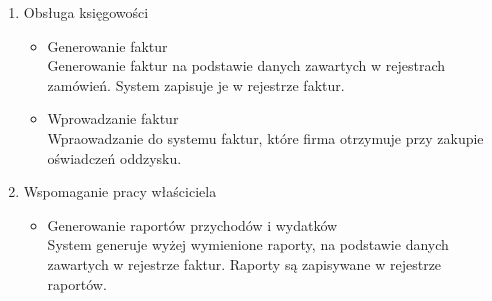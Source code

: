 \begin{enumerate}
	\item Obsługa księgowości
		\begin{itemize}
		\item Generowanie faktur \\ 
		Generowanie faktur na podstawie danych zawartych w rejestrach zamówień. System zapisuje je w rejestrze faktur.
		\item Wprowadzanie faktur \\
		Wpraowadzanie do systemu faktur, które firma otrzymuje przy zakupie oświadczeń oddzysku.
		\end{itemize}

	\item Wspomaganie pracy właściciela
		\begin{itemize}
		\item Generowanie raportów przychodów i wydatków\\
		System generuje wyżej wymienione raporty, na podstawie danych zawartych w rejestrze faktur. Raporty są zapisywane w rejestrze raportów.
		\end{itemize}

\end{enumerate}